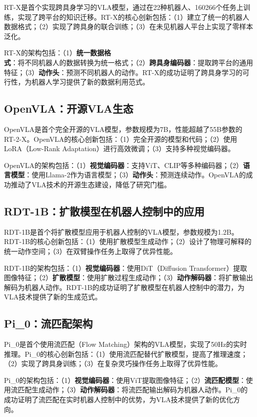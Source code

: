 \documentclass[12pt,a4paper]{article}
\begin{document}
RT-X\cite{rtx}是首个实现跨具身学习的VLA模型，通过在22种机器人、160266个任务上训练，实现了跨平台的知识迁移。RT-X的核心创新包括：（1）建立了统一的机器人数据格式；（2）实现了跨具身的联合训练；（3）在未见机器人平台上实现了零样本泛化。

RT-X的架构包括：（1）\textbf{统一数据格式}：将不同机器人的数据转换为统一格式；（2）\textbf{跨具身编码器}：提取跨平台的通用特征；（3）\textbf{动作头}：预测不同机器人的动作。RT-X的成功证明了跨具身学习的可行性，为机器人学习提供了新的数据利用范式。

\subsection{OpenVLA：开源VLA生态}

OpenVLA\cite{openvla}是首个完全开源的VLA模型，参数规模为7B，性能超越了55B参数的RT-2-X。OpenVLA的核心创新包括：（1）完全开源的模型和代码；（2）使用LoRA（Low-Rank Adaptation）进行高效微调；（3）支持多种视觉编码器。

OpenVLA的架构包括：（1）\textbf{视觉编码器}：支持ViT、CLIP等多种编码器；（2）\textbf{语言模型}：使用Llama-2作为语言模型；（3）\textbf{动作头}：预测连续动作。OpenVLA的成功推动了VLA技术的开源生态建设，降低了研究门槛。

\subsection{RDT-1B：扩散模型在机器人控制中的应用}

RDT-1B\cite{rdt1b}是首个将扩散模型应用于机器人控制的VLA模型，参数规模为1.2B。RDT-1B的核心创新包括：（1）使用扩散模型生成动作；（2）设计了物理可解释的统一动作空间；（3）在双臂操作任务上取得了优异性能。

RDT-1B的架构包括：（1）\textbf{视觉编码器}：使用DiT（Diffusion Transformer）提取图像特征；（2）\textbf{扩散模型}：使用扩散过程生成动作；（3）\textbf{动作解码器}：将扩散输出解码为机器人动作。RDT-1B的成功证明了扩散模型在机器人控制中的潜力，为VLA技术提供了新的生成范式。

\subsection{Pi\_0：流匹配架构}

Pi\_0\cite{pi0}是首个使用流匹配（Flow Matching）架构的VLA模型，实现了50Hz的实时推理。Pi\_0的核心创新包括：（1）使用流匹配替代扩散模型，提高了推理速度；（2）实现了跨具身训练；（3）在复杂灵巧操作任务上取得了优异性能。

Pi\_0的架构包括：（1）\textbf{视觉编码器}：使用ViT提取图像特征；（2）\textbf{流匹配模型}：使用流匹配生成动作；（3）\textbf{动作解码器}：将流匹配输出解码为机器人动作。Pi\_0的成功证明了流匹配在实时机器人控制中的优势，为VLA技术提供了新的优化方向。
\end{document}
